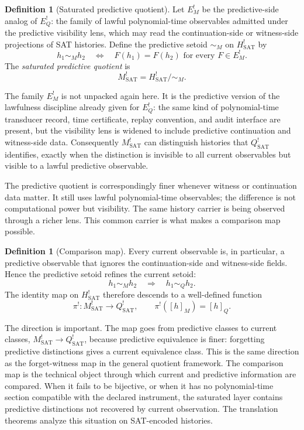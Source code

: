 \documentclass[11pt]{article}
\newcommand{\Hsat}{H^{!}_{\mathrm{SAT}}}
\newcommand{\EQbang}{E^{!}_{Q}}
\newcommand{\EMbang}{E^{!}_{M}}
\newcommand{\Qsat}{Q^{!}_{\mathrm{SAT}}}
\newcommand{\Msat}{M^{!}_{\mathrm{SAT}}}
\newcommand{\ComparisonMap}{\pi^{!}}
\theoremstyle{definition}
\newtheorem{definition}[theorem]{Definition}
\begin{document}
\begin{definition}[Saturated predictive quotient]
\label{def:pvnp:m-saturated}
Let \(\EMbang\) be the predictive-side analog of \(\EQbang\): the
family of lawful polynomial-time observables admitted under the
predictive visibility lens, which may read the continuation-side or
witness-side projections of SAT histories.  Define the predictive
setoid \(\sim_{M}\) on \(\Hsat\) by
\[
  h_{1}\sim_{M}h_{2}
  \quad\Longleftrightarrow\quad
  F(h_{1})=F(h_{2})
  \text{ for every } F\in\EMbang .
\]
The \emph{saturated predictive quotient} is
\[
  \Msat=\Hsat/{\sim_{M}} .
\]
\end{definition}

The family \(\EMbang\) is not unpacked again here.  It is the
predictive version of the lawfulness discipline already given for
\(\EQbang\): the same kind of polynomial-time transducer record, time
certificate, replay convention, and audit interface are present, but
the visibility lens is widened to include predictive continuation and
witness-side data.  Consequently \(\Msat\) can distinguish histories
that \(\Qsat\) identifies, exactly when the distinction is invisible
to all current observables but visible to a lawful predictive
observable.

The predictive quotient is correspondingly finer whenever witness or
continuation data matter.  It still uses lawful polynomial-time
observables; the difference is not computational power but visibility.
The same history carrier is being observed through a richer lens.
This common carrier is what makes a comparison map possible.

\begin{definition}[Comparison map]
\label{def:pvnp:comparison-map}
Every current observable is, in particular, a predictive observable
that ignores the continuation-side and witness-side fields.  Hence
the predictive setoid refines the current setoid:
\[
  h_{1}\sim_{M}h_{2}
  \quad\Longrightarrow\quad
  h_{1}\sim_{Q}h_{2}.
\]
The identity map on \(\Hsat\) therefore descends to a well-defined
function
\[
  \ComparisonMap:\Msat\longrightarrow\Qsat,
  \qquad
  \ComparisonMap([h]_{M})=[h]_{Q}.
\]
\end{definition}

The direction is important.  The map goes from predictive classes to
current classes, \(\Msat\to\Qsat\), because predictive equivalence is
finer: forgetting predictive distinctions gives a current equivalence
class.  This is the same direction as the forget-witness map in the
general quotient framework.  The comparison map is the technical
object through which current and predictive information are compared.
When it fails to be bijective, or when it has no polynomial-time
section compatible with the declared instrument, the saturated layer
contains predictive distinctions not recovered by current
observation.  The translation theorems analyze this situation on
SAT-encoded histories.
\end{document}
